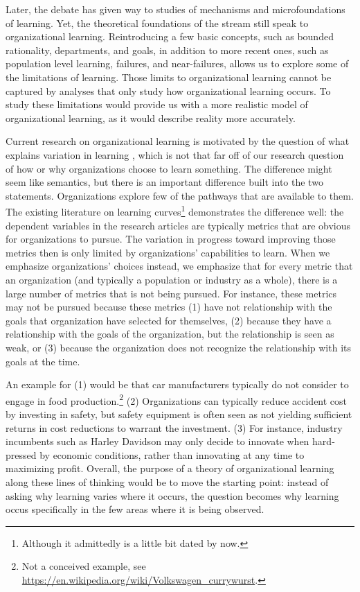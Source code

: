 \documentclass[12pt, man, natbib]{apa6}
\begin{document}
	Later, the debate has given way to studies of mechanisms and microfoundations of learning. Yet, the theoretical foundations of the stream still speak to organizational learning. Reintroducing a few basic concepts, such as bounded rationality, departments, and goals, in addition to more recent ones, such as population level learning, failures, and near-failures, allows us to explore some of the limitations of learning. Those limits to organizational learning cannot be captured by analyses that only study how organizational learning occurs. To study these limitations would provide us with a more realistic model of organizational learning, as it would describe reality more accurately. 
	
	Current research on organizational learning is motivated by the question of what explains variation in learning \citep[p. 2]{Argote2013a}, which is not that far off of our research question of how or why organizations choose to learn something. The difference might seem like semantics, but there is an important difference built into the two statements. Organizations explore few of the pathways that are available to them. The existing literature on learning curves\footnote{Although it admittedly is a little bit dated by now.} demonstrates the difference well: the dependent variables in the research articles are typically metrics that are obvious for organizations to pursue. The variation in progress toward improving those metrics then is only limited by organizations' capabilities to learn. When we emphasize organizations' choices instead, we emphasize that for every metric that an organization (and typically a population or industry as a whole), there is a large number of metrics that is not being pursued. For instance, these metrics may not be pursued because these metrics (1) have not relationship with the goals that organization have selected for themselves, (2) because they have a relationship with the goals of the organization, but the relationship is seen as weak, or (3) because the organization does not recognize the relationship with its goals at the time.
	
	An example for (1) would be that car manufacturers typically do not consider to engage in food production.\footnote{Not a conceived example, see \url{https://en.wikipedia.org/wiki/Volkswagen\_currywurst}.} (2) Organizations can typically reduce accident cost by investing in safety, but safety equipment is often seen as not yielding sufficient returns in cost reductions to warrant the investment. (3) For instance, industry incumbents such as Harley Davidson may only decide to innovate when hard-pressed by economic conditions, rather than innovating at any time to maximizing profit. Overall, the purpose of a theory of organizational learning along these lines of thinking would be to move the starting point: instead of asking why learning varies where it occurs, the question becomes why learning occus specifically in the few areas where it is being observed.
	
\end{document}
